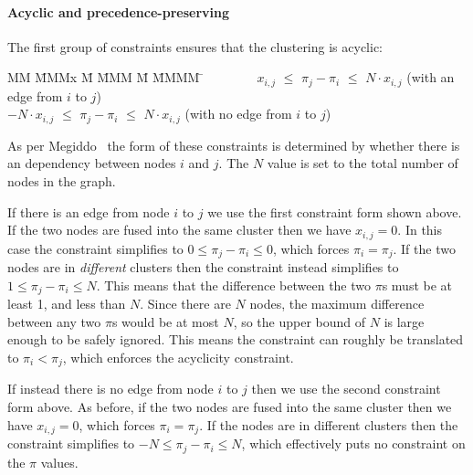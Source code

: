 

\paragraph{Acyclic and precedence-preserving} The first group of constraints ensures that the clustering is acyclic:
\begin{tabbing}
MM  \= MMMx \= M \= MMM \= M \= MMMM \= \kill
    \> ~~~~~~~ $x_{i,j}$ \> $\le$ \> $\pi_j - \pi_i$ \> $\le$ \> $N \cdot x_{i,j}$ 
    \>             (with an edge from $i$ to $j$)            \\
    \> $-N \cdot  x_{i,j}$  \> $\le$ \> $\pi_j - \pi_i$ \> $\le$ \> $N \cdot x_{i,j}$ 
    \>             (with no edge from $i$ to $j$)
\end{tabbing}

As per Megiddo~\cite{megiddo1998optimal} the form of these constraints is determined by whether there is an dependency between nodes $i$ and $j$. The $N$ value is set to the total number of nodes in the graph.

If there is an edge from node $i$ to $j$ we use the first constraint form shown above. If the two nodes are fused into the same cluster then we have $x_{i,j} = 0$. In this case the constraint simplifies to $0 \le \pi_j - \pi_i \le 0$, which forces $\pi_i = \pi_j$. If the two nodes are in \emph{different} clusters then the constraint instead simplifies to $1 \le \pi_j - \pi_i \le N$. This means that the difference between the two $\pi$s must be at least 1, and less than $N$. Since there are $N$ nodes, the maximum difference between any two $\pi$s would be at most $N$, so the upper bound of $N$ is large enough to be safely ignored. This means the constraint can roughly be translated to $\pi_i < \pi_j$, which enforces the acyclicity constraint.

If instead there is no edge from node $i$ to $j$ then we use the second constraint form above. As before, if the two nodes are fused into the same cluster then we have $x_{i,j} = 0$, which forces $\pi_i = \pi_j$. If the nodes are in different clusters then the constraint simplifies to $-N \le \pi_j - \pi_i \le N$, which effectively puts no constraint on the $\pi$ values.


